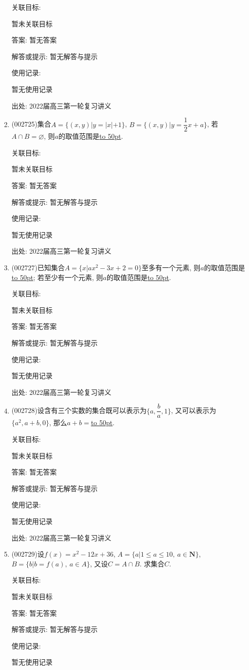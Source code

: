 \documentclass[10pt,a4paper]{article}
\newcommand{\blank}[1]{\underline{\hbox to #1pt{}}}
\begin{document}
\begin{enumerate}[1.]
关联目标:

暂未关联目标

答案: 暂无答案

解答或提示: 暂无解答与提示

使用记录:

暂无使用记录


出处: 2022届高三第一轮复习讲义
\item { (002725)}集合$A=\{(x,y)|y=|x|+1\}$, $B=\{(x,y)|y=\dfrac12x+a\}$, 若$A\cap B=\varnothing$, 则$a$的取值范围是\blank{50}.


关联目标:

暂未关联目标

答案: 暂无答案

解答或提示: 暂无解答与提示

使用记录:

暂无使用记录


出处: 2022届高三第一轮复习讲义
\item { (002727)}已知集合$A=\{x|ax^2-3x+2=0\}$至多有一个元素, 则$a$的取值范围是\blank{50}; 若至少有一个元素, 则$a$的取值范围是\blank{50}.


关联目标:

暂未关联目标

答案: 暂无答案

解答或提示: 暂无解答与提示

使用记录:

暂无使用记录


出处: 2022届高三第一轮复习讲义
\item { (002728)}设含有三个实数的集合既可以表示为$\{a,\dfrac ba,1\}$, 又可以表示为$\{a^2,a+b,0\}$, 那么$a+b=$\blank{50}.


关联目标:

暂未关联目标

答案: 暂无答案

解答或提示: 暂无解答与提示

使用记录:

暂无使用记录


出处: 2022届高三第一轮复习讲义
\item { (002729)}设$f(x)=x^2-12x+36$, $A=\{a|1\le a\le 10, \ a\in \mathbf{N}\}$, $B=\{b|b=f(a),\ a\in A\}$, 又设$C=A\cap B$. 求集合$C$.


关联目标:

暂未关联目标

答案: 暂无答案

解答或提示: 暂无解答与提示

使用记录:

暂无使用记录



\end{enumerate}
\end{document}
